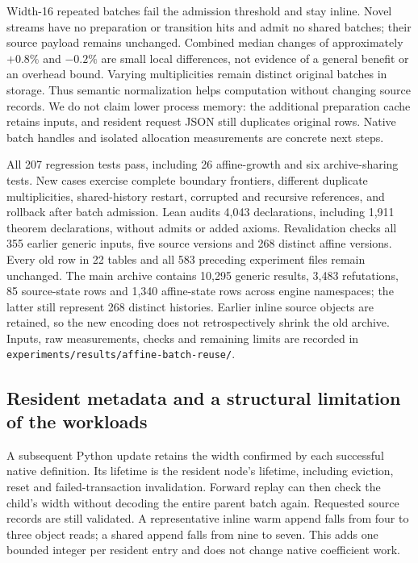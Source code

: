 \documentclass[11pt,a4paper]{article}
\numberwithin{equation}{section}
\theoremstyle{plain}
\theoremstyle{definition}
\theoremstyle{remark}
\begin{document}
Width-16 repeated batches fail the admission threshold and stay inline. Novel streams have no preparation or transition hits and admit no shared batches; their source payload remains unchanged. Combined median changes of approximately $+0.8\%$ and $-0.2\%$ are small local differences, not evidence of a general benefit or an overhead bound. Varying multiplicities remain distinct original batches in storage. Thus semantic normalization helps computation without changing source records. We do not claim lower process memory: the additional preparation cache retains inputs, and resident request JSON still duplicates original rows. Native batch handles and isolated allocation measurements are concrete next steps.

All 207 regression tests pass, including 26 affine-growth and six archive-sharing tests. New cases exercise complete boundary frontiers, different duplicate multiplicities, shared-history restart, corrupted and recursive references, and rollback after batch admission. Lean audits 4,043 declarations, including 1,911 theorem declarations, without admits or added axioms. Revalidation checks all 355 earlier generic inputs, five source versions and 268 distinct affine versions. Every old row in 22 tables and all 583 preceding experiment files remain unchanged. The main archive contains 10,295 generic results, 3,483 refutations, 85 source-state rows and 1,340 affine-state rows across engine namespaces; the latter still represent 268 distinct histories. Earlier inline source objects are retained, so the new encoding does not retrospectively shrink the old archive. Inputs, raw measurements, checks and remaining limits are recorded in \texttt{experiments/results/affine-batch-reuse/}.


\subsection{Resident metadata and a structural limitation of the workloads}

A subsequent Python update retains the width confirmed by each successful native definition. Its lifetime is the resident node's lifetime, including eviction, reset and failed-transaction invalidation. Forward replay can then check the child's width without decoding the entire parent batch again. Requested source records are still validated. A representative inline warm append falls from four to three object reads; a shared append falls from nine to seven. This adds one bounded integer per resident entry and does not change native coefficient work.
\end{document}
